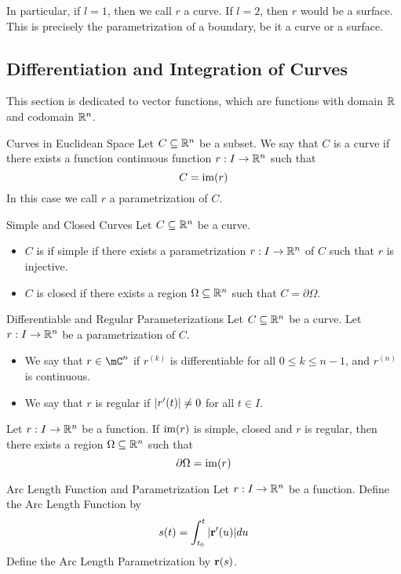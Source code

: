 \documentclass[a4paper]{article}
\begin{document}
In particular, if $l=1$, then we call $r$ a curve. If $l=2$, then $r$ would be a surface. This is precisely the parametrization of a boundary, be it a curve or a surface. 

\subsection{Differentiation and Integration of Curves}
This section is dedicated to vector functions, which are functions with domain $\mathbb{R}$ and codomain $\mathbb{R}^n$. 

\begin{defn}{Curves in Euclidean Space}{} Let $C\subseteq\mathbb{R}^n$ be a subset. We say that $C$ is a curve if there exists a function continuous function $r:I\to\mathbb{R}^n$ such that $$C=\operatorname{im}(r)$$ In this case we call $r$ a parametrization of $C$. 
\end{defn}

\begin{defn}{Simple and Closed Curves}{} Let $C\subseteq\mathbb{R}^n$ be a curve. 
\begin{itemize}
\item $C$ is if simple if there exists a parametrization $r:I\to\mathbb{R}^n$ of $C$ such that $r$ is injective. 
\item $C$ is closed if there exists a region $\Omega\subseteq\mathbb{R}^n$ such that $C=\partial\Omega$. 
\end{itemize}
\end{defn}

\begin{defn}{Differentiable and Regular Parameterizations}{} Let $C\subseteq\mathbb{R}^n$ be a curve. Let $r:I\to\mathbb{R}^n$ be a parametrization of $C$. 
\begin{itemize}
\item We say that $r\in\mC^n$ if $r^{(k)}$ is differentiable for all $0\leq k\leq n-1$, and $r^{(n)}$ is continuous. 
\item We say that $r$ is regular if $\abs{r'(t)}\neq 0$ for all $t\in I$. 
\end{itemize}
\end{defn}

\begin{prp}{}{} Let $r:I\to\mathbb{R}^n$ be a function. If $\operatorname{im}(r)$ is simple, closed and $r$ is regular, then there exists a region $\Omega\subseteq\mathbb{R}^n$ such that $$\partial\Omega=\operatorname{im}(r)$$
\end{prp}

\begin{defn}{Arc Length Function and Parametrization}{} Let $r:I\to\mathbb{R}^n$ be a function. Define the Arc Length Function by $$s(t)=\int_{t_0}^{t}\abs{\vb{r}'(u)}du$$ Define the Arc Length Parametrization by $\vb{r}(s)$. 
\end{defn}
\end{document}
